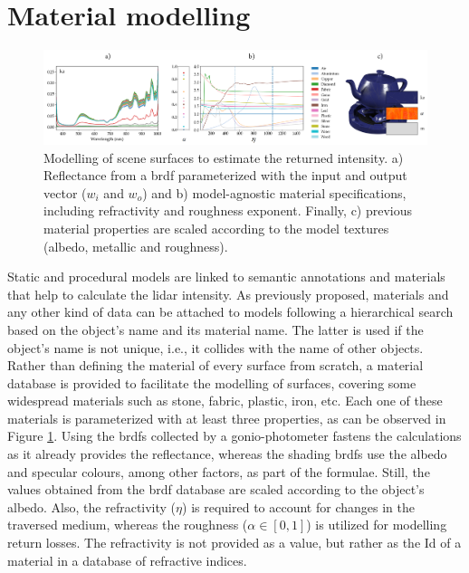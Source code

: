 \section{Material modelling}

\begin{figure}
    \centering
    \includegraphics[width=\linewidth]{figs/lidar_intensity/brdf_properties.png}
	\caption{Modelling of scene surfaces to estimate the returned intensity. a) Reflectance from a \acrshort{brdf} parameterized with the input and output vector ($w_i$ and $w_o$) \cite{dupuy_adaptive_2018} and b) model-agnostic material specifications, including refractivity and roughness exponent. Finally, c) previous material properties are scaled according to the model textures (albedo, metallic and roughness). }
	\label{fig:lidar_brdf_properties}
\end{figure}

Static and procedural models are linked to semantic annotations and materials that help to calculate the \acrshort{lidar} intensity. As previously proposed, materials and any other kind of data can be attached to models following a hierarchical search based on the object's name and its material name. The latter is used if the object's name is not unique, i.e., it collides with the name of other objects. Rather than defining the material of every surface from scratch, a material database is provided to facilitate the modelling of surfaces, covering some widespread materials such as stone, fabric, plastic, iron, etc. Each one of these materials is parameterized with at least three properties, as can be observed in Figure \ref{fig:lidar_brdf_properties}. Using the \acrshort{brdf}s collected by a gonio-photometer fastens the calculations as it already provides the reflectance, whereas the shading \acrshort{brdf}s use the albedo and specular colours, among other factors, as part of the formulae. Still, the values obtained from the \acrshort{brdf} database are scaled according to the object's albedo. Also, the refractivity ($\eta$) is required to account for changes in the traversed medium, whereas the roughness ($\alpha \in [0, 1]$) is utilized for modelling return losses. The refractivity is not provided as a value, but rather as the Id of a material in a database of refractive indices. 

